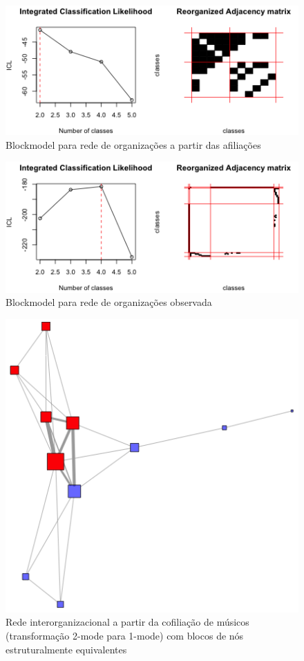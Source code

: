 \documentclass[a4paper, 12pt, openright, oneside, german, french, english, brazil]{abntex2}
\begin{document}
	
	\begin{figure}[!ht]
		\centering
		\caption{Blockmodel para rede de organizações a partir das afiliações}
		\label{sbmout:mesonivel2}
		\includegraphics[scale=.8]{blockmesonivel2.png}
	\end{figure}

	\begin{figure}[!ht]
		\centering
		\caption{Blockmodel para rede de organizações observada}
		\label{sbmout:orgs}
		\includegraphics[scale=.8]{blockoutorgs.png}
	\end{figure}

	\begin{figure}[!ht]
		\centering
		\caption{Rede interorganizacional a partir da cofiliação de músicos (transformação 2-mode para 1-mode) com blocos de nós estruturalmente equivalentes}
		\label{blocos:mesonivel2}
		\includegraphics[scale=.7]{block_rede_mesonivel2.png}
	\end{figure}
	
\end{document}
